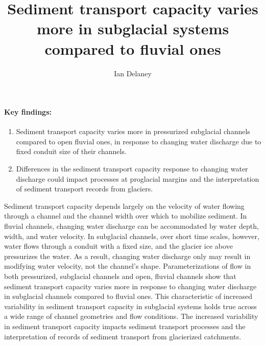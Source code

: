\documentclass[11pt]{article}
\author[1]{Ian Delaney}
\affil[1]{Institut des dynamiques de la surface terrestre (IDYST), Universit\'{e} de Lausanne, B\^{a}timent G\'{e}opolis, CH-1015 Lausanne}
\title{Sediment transport capacity varies more in subglacial systems compared to fluvial ones}
\begin{document}
        \maketitle
        
        \paragraph{Key findings:}
        \begin{enumerate}
        \item Sediment transport capacity varies more in pressurized subglacial channels compared to open fluvial ones, in response to changing water discharge due to fixed conduit size of their channels.
        \item Differences in the sediment transport capacity response to changing water discharge could impact processes at proglacial margins and the interpretation of sediment transport records from glaciers. 
        \end{enumerate}
        
        \abstract %
        Sediment transport capacity depends largely on the velocity of water flowing through a channel and the channel width over which to mobilize sediment.
        In fluvial channels, changing water discharge can be accommodated by water depth, width, and water velocity.
        In subglacial channels, over short time scales, however, water flows through a conduit with a fixed size, and the glacier ice above pressurizes the water.
        As a result, changing water discharge only may result in modifying water velocity, not the channel's shape.
        Parameterizations of flow in both pressurized, subglacial channels and  open, fluvial channels show that sediment transport capacity varies  more in response to changing water discharge in subglacial channels compared to fluvial ones.
        This characteristic of increased variability in sediment transport capacity in subglacial systems holds true  across a wide range of channel geometries and flow conditions.
        The increased variability in sediment transport capacity impacts sediment transport processes and the interpretation of records of sediment transport from glacierized catchments.
        
        \vspace{0.5cm}
        
\end{document}
